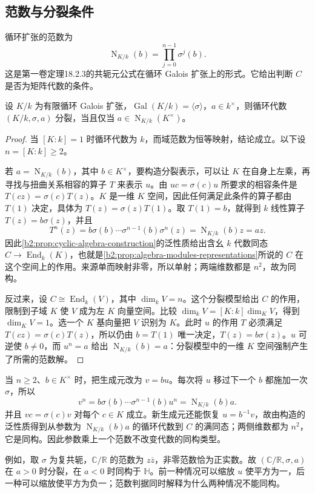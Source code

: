 \subsection{范数与分裂条件}
\label{b2:subsec:1802:03}

循环扩张的范数为
\[
	\operatorname{N}_{K/k}(b)=\prod_{j=0}^{n-1}\sigma^j(b).
\]
这是第一卷定理18.2.3的共轭元公式在循环 Galois 扩张上的形式。它给出判断 \(C\) 是否为矩阵代数的条件。

\begin{theorem}[循环代数的分裂判据]\label{b2:thm:cyclic-algebra-norm-splitting}
	设 \(K/k\) 为有限循环 Galois 扩张，\(\operatorname{Gal}(K/k)=\langle\sigma\rangle\)，\(a\in k^\times\)，则循环代数 \((K/k,\sigma,a)\) 分裂，当且仅当 \(a\in\operatorname{N}_{K/k}(K^\times)\)。
\end{theorem}
\begin{proof}
	当 \([K:k]=1\) 时循环代数为 \(k\)，而域范数为恒等映射，结论成立。以下设 \(n=[K:k]\ge2\)。

	若 \(a=\operatorname{N}_{K/k}(b)\)，其中 \(b\in K^\times\)，要构造分裂表示，可以让 \(K\) 在自身上左乘，再寻找与扭曲关系相容的算子 \(T\) 来表示 \(u\)。由 \(uc=\sigma(c)u\) 所要求的相容条件是 \(T(cz)=\sigma(c)T(z)\)。\(K\) 是一维 \(K\) 空间，因此任何满足此条件的算子都由 \(T(1)\) 决定，具体为 \(T(z)=\sigma(z)T(1)\)。取 \(T(1)=b\)，就得到 \(k\) 线性算子 \(T(z)=b\sigma(z)\)，并且
	\[
		T^n(z)=b\sigma(b)\cdots\sigma^{n-1}(b)\sigma^n(z) =\operatorname{N}_{K/k}(b)z=az.
	\]
	因此\cref{b2:prop:cyclic-algebra-construction}的泛性质给出含幺 \(k\) 代数同态 \(C\to\operatorname{End}_k(K)\)，也就是\cref{b2:prop:algebra-modules-representations}所说的 \(C\) 在这个空间上的作用。来源单而映射非零，所以单射；两端维数都是 \(n^2\)，故为同构。

	反过来，设 \(C\cong\operatorname{End}_k(V)\)，其中 \(\dim_kV=n\)。这个分裂模型给出 \(C\) 的作用，限制到子域 \(K\) 使 \(V\) 成为左 \(K\) 向量空间。比较 \(\dim_kV=[K:k]\dim_KV\)，得到 \(\dim_KV=1\)。选一个 \(K\) 基向量把 \(V\) 识别为 \(K\)。此时 \(u\) 的作用 \(T\) 必须满足 \(T(cz)=\sigma(c)T(z)\)，所以仍由 \(b=T(1)\) 唯一决定，\(T(z)=b\sigma(z)\)。\(u\) 可逆使 \(b\ne0\)，而 \(u^n=a\) 给出 \(\operatorname{N}_{K/k}(b)=a\)：分裂模型中的一维 \(K\) 空间强制产生了所需的范数解。
\end{proof}

当 \(n\ge2\)、\(b\in K^\times\) 时，把生成元改为 \(v=bu\)。每次将 \(u\) 移过下一个 \(b\) 都施加一次 \(\sigma\)，所以
\[
	v^n=b\sigma(b)\cdots\sigma^{n-1}(b)u^n =\operatorname{N}_{K/k}(b)a.
\]
并且 \(vc=\sigma(c)v\) 对每个 \(c\in K\) 成立。新生成元还能恢复 \(u=b^{-1}v\)，故由构造的泛性质得到从参数为 \(\operatorname{N}_{K/k}(b)a\) 的循环代数到 \(C\) 的满同态；两侧维数都为 \(n^2\)，它是同构。因此参数乘上一个范数不改变代数的同构类型。

\ProseParagraphBreak
例如，取 \(\sigma\) 为复共轭，\(\mathbb C/\mathbb R\) 的范数为 \(z\overline z\)，非零范数恰为正实数。故 \((\mathbb C/\mathbb R,\sigma,a)\) 在 \(a>0\) 时分裂，在 \(a<0\) 时同构于 \(\mathbb H\)。前一种情况可以缩放 \(u\) 使平方为一，后一种可以缩放使平方为负一；范数判据同时解释为什么两种情况不能同构。
